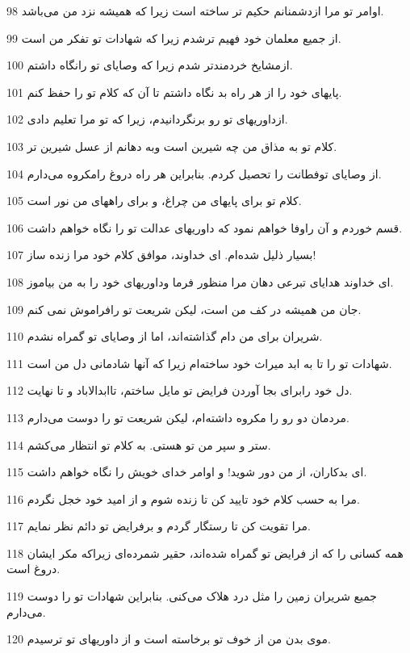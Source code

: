 \par 98 اوامر تو مرا ازدشمنانم حکیم تر ساخته است زیرا که همیشه نزد من می‌باشد.
\par 99 از جمیع معلمان خود فهیم ترشدم زیرا که شهادات تو تفکر من است.
\par 100 ازمشایخ خردمندتر شدم زیرا که وصایای تو رانگاه داشتم.
\par 101 پایهای خود را از هر راه بد نگاه داشتم تا آن که کلام تو را حفظ کنم.
\par 102 ازداوریهای تو رو برنگردانیدم، زیرا که تو مرا تعلیم دادی.
\par 103 کلام تو به مذاق من چه شیرین است وبه دهانم از عسل شیرین تر.
\par 104 از وصایای توفطانت را تحصیل کردم. بنابراین هر راه دروغ رامکروه می‌دارم.
\par 105 کلام تو برای پایهای من چراغ، و برای راههای من نور است.
\par 106 قسم خوردم و آن راوفا خواهم نمود که داوریهای عدالت تو را نگاه خواهم داشت.
\par 107 بسیار ذلیل شده‌ام. ای خداوند، موافق کلام خود مرا زنده ساز!
\par 108 ‌ای خداوند هدایای تبرعی دهان مرا منظور فرما وداوریهای خود را به من بیاموز.
\par 109 جان من همیشه در کف من است، لیکن شریعت تو رافراموش نمی کنم.
\par 110 شریران برای من دام گذاشته‌اند، اما از وصایای تو گمراه نشدم.
\par 111 شهادات تو را تا به ابد میراث خود ساخته‌ام زیرا که آنها شادمانی دل من است.
\par 112 دل خود رابرای بجا آوردن فرایض تو مایل ساختم، تاابدالاباد و تا نهایت.
\par 113 مردمان دو رو را مکروه داشته‌ام، لیکن شریعت تو را دوست می‌دارم.
\par 114 ستر و سپر من تو هستی. به کلام تو انتظار می‌کشم.
\par 115 ‌ای بدکاران، از من دور شوید! و اوامر خدای خویش را نگاه خواهم داشت.
\par 116 مرا به حسب کلام خود تایید کن تا زنده شوم و از امید خود خجل نگردم.
\par 117 مرا تقویت کن تا رستگار گردم و برفرایض تو دائم نظر نمایم.
\par 118 همه کسانی را که از فرایض تو گمراه شده‌اند، حقیر شمرده‌ای زیراکه مکر ایشان دروغ است.
\par 119 جمیع شریران زمین را مثل درد هلاک می‌کنی. بنابراین شهادات تو را دوست می‌دارم.
\par 120 موی بدن من از خوف تو برخاسته است و از داوریهای تو ترسیدم.
